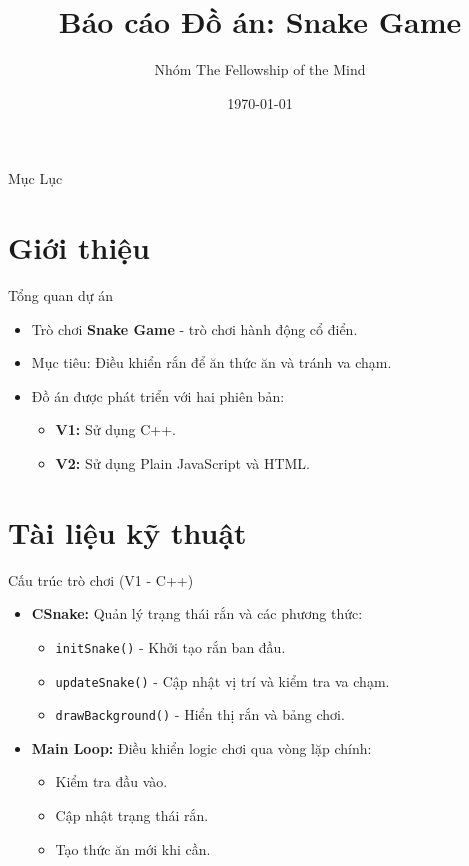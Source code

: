 \documentclass{beamer}
\title{Báo cáo Đồ án: Snake Game}
\author{Nhóm The Fellowship of the Mind}
\date{\today}
\begin{document}
\begin{frame}
    \titlepage
\end{frame}

\begin{frame}{Mục Lục}
    \tableofcontents
\end{frame}

\section{Giới thiệu}
\begin{frame}{Tổng quan dự án}
    \begin{itemize}
        \item Trò chơi \textbf{Snake Game} - trò chơi hành động cổ điển.
        \item Mục tiêu: Điều khiển rắn để ăn thức ăn và tránh va chạm.
        \item Đồ án được phát triển với hai phiên bản:
        \begin{itemize}
            \item \textbf{V1:} Sử dụng C++.
            \item \textbf{V2:} Sử dụng Plain JavaScript và HTML.
        \end{itemize}
    \end{itemize}
\end{frame}

\section{Tài liệu kỹ thuật}
\begin{frame}{Cấu trúc trò chơi (V1 - C++)}
    \begin{itemize}
        \item \textbf{CSnake:} Quản lý trạng thái rắn và các phương thức:
        \begin{itemize}
            \item \texttt{initSnake()} - Khởi tạo rắn ban đầu.
            \item \texttt{updateSnake()} - Cập nhật vị trí và kiểm tra va chạm.
            \item \texttt{drawBackground()} - Hiển thị rắn và bảng chơi.
        \end{itemize}
        \item \textbf{Main Loop:} Điều khiển logic chơi qua vòng lặp chính:
        \begin{itemize}
            \item Kiểm tra đầu vào.
            \item Cập nhật trạng thái rắn.
            \item Tạo thức ăn mới khi cần.
        \end{itemize}
    \end{itemize}
\end{frame}
\end{document}
